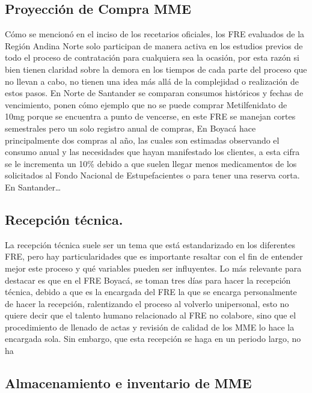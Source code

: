\documentclass[
]{book}
\begin{document}
\hypertarget{proyecciuxf3n-de-compra-mme}{%
\subsection{Proyección de Compra MME}\label{proyecciuxf3n-de-compra-mme}}

Cómo se mencionó en el inciso de los recetarios oficiales, los FRE evaluados de la Región Andina Norte solo participan de manera activa en los estudios previos de todo el proceso de contratación para cualquiera sea la ocasión, por esta razón si bien tienen claridad sobre la demora en los tiempos de cada parte del proceso que no llevan a cabo, no tienen una idea más allá de la complejidad o realización de estos pasos. En Norte de Santander se comparan consumos históricos y fechas de vencimiento, ponen cómo ejemplo que no se puede comprar Metilfenidato de 10mg porque se encuentra a punto de vencerse, en este FRE se manejan cortes semestrales pero un solo registro anual de compras, En Boyacá hace principalmente dos compras al año, las cuales son estimadas observando el consumo anual y las necesidades que hayan manifestado los clientes, a esta cifra se le incrementa un 10\% debido a que suelen llegar menos medicamentos de los solicitados al Fondo Nacional de Estupefacientes o para tener una reserva corta. En Santander\ldots{}

\hypertarget{recepciuxf3n-tuxe9cnica.}{%
\subsection{Recepción técnica.}\label{recepciuxf3n-tuxe9cnica.}}

La recepción técnica suele ser un tema que está estandarizado en los diferentes FRE, pero hay particularidades que es importante resaltar con el fin de entender mejor este proceso y qué variables pueden ser influyentes. Lo más relevante para destacar es que en el FRE Boyacá, se toman tres días para hacer la recepción técnica, debido a que es la encargada del FRE la que se encarga personalmente de hacer la recepción, ralentizando el proceso al volverlo unipersonal, esto no quiere decir que el talento humano relacionado al FRE no colabore, sino que el procedimiento de llenado de actas y revisión de calidad de los MME lo hace la encargada sola. Sin embargo, que esta recepción se haga en un periodo largo, no ha

\hypertarget{almacenamiento-e-inventario-de-mme}{%
\subsection{Almacenamiento e inventario de MME}\label{almacenamiento-e-inventario-de-mme}}
\end{document}
